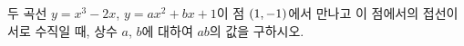 두 곡선 $y=x^3-2x$, $y=ax^2+bx+1$이 점 $(1{,}\mkern3mu\mathopen{}-1)$에서 만나고 이 점에서의 접선이 서로 수직일 때, 상수 $a$, $b$에 대하여 $ab$의 값을 구하시오.
